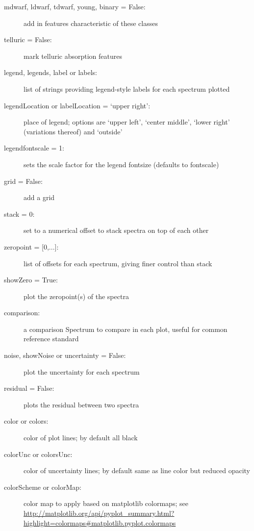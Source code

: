 \documentclass[letterpaper,10pt,english]{sphinxmanual}
\begin{document}
\begin{fulllineitems}
\begin{description}
\item[{mdwarf, ldwarf, tdwarf, young, binary = False:}] \leavevmode
add in features characteristic of these classes

\item[{telluric = False:}] \leavevmode
mark telluric absorption features

\item[{legend, legends, label or labels:}] \leavevmode
list of strings providing legend-style labels for each spectrum plotted

\item[{legendLocation or labelLocation = `upper right':}] \leavevmode
place of legend; options are `upper left', `center middle', `lower right' (variations thereof) and `outside'

\item[{legendfontscale = 1:}] \leavevmode
sets the scale factor for the legend fontsize (defaults to fontscale)

\item[{grid = False:}] \leavevmode
add a grid

\item[{stack = 0:}] \leavevmode
set to a numerical offset to stack spectra on top of each other

\item[{zeropoint = {[}0,...{]}:}] \leavevmode
list of offsets for each spectrum, giving finer control than stack

\item[{showZero = True:}] \leavevmode
plot the zeropoint(s) of the spectra

\item[{comparison:}] \leavevmode
a comparison Spectrum to compare in each plot, useful for common reference standard

\item[{noise, showNoise or uncertainty = False:}] \leavevmode
plot the uncertainty for each spectrum

\item[{residual = False:}] \leavevmode
plots the residual between two spectra

\item[{color or colors:}] \leavevmode
color of plot lines; by default all black

\item[{colorUnc or colorsUnc:}] \leavevmode
color of uncertainty lines; by default same as line color but reduced opacity

\item[{colorScheme or colorMap:}] \leavevmode
color map to apply based on matplotlib colormaps;
see \url{http://matplotlib.org/api/pyplot\_summary.html?highlight=colormaps\#matplotlib.pyplot.colormaps}


\end{description}
\end{fulllineitems}
\end{document}
